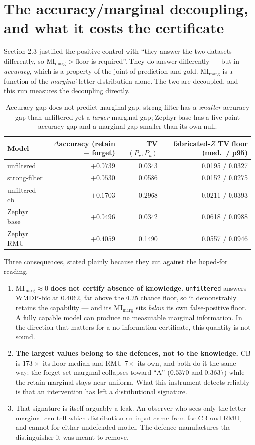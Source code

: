 \documentclass[11pt]{article}
\begin{document}
\section{The accuracy/marginal decoupling, and what it costs the certificate}
Section 2.3 justified the positive control with ``they answer the two datasets
differently, so $\mathrm{MI}_{\mathrm{marg}}>\text{floor}$ is required''. They do answer
differently --- but in \emph{accuracy}, which is a property of the joint of prediction and
gold. $\mathrm{MI}_{\mathrm{marg}}$ is a function of the \emph{marginal} letter distribution
alone. The two are decoupled, and this run measures the decoupling directly.
\begin{table}[h]\centering\small
\begin{tabular}{lrrr}
\toprule
Model & $\Delta$accuracy (retain $-$ forget) & TV$(P_r,P_u)$ & fabricated-$Z$ TV floor (med.\ / p95)\\
\midrule
unfiltered & $+0.0739$ & 0.0343 & 0.0195 / 0.0327\\
strong-filter & $+0.0530$ & 0.0586 & 0.0152 / 0.0275\\
unfiltered-cb & $+0.1703$ & 0.2968 & 0.0211 / 0.0393\\
Zephyr base & $+0.0496$ & 0.0342 & 0.0618 / 0.0988\\
Zephyr RMU & $+0.4059$ & 0.1490 & 0.0557 / 0.0946\\
\bottomrule\end{tabular}
\caption{Accuracy gap does not predict marginal gap. strong-filter has a
\emph{smaller} accuracy gap than unfiltered yet a \emph{larger} marginal gap; Zephyr base has
a five-point accuracy gap and a marginal gap smaller than its own null.}\label{tab:decouple}
\end{table}
Three consequences, stated plainly because they cut against the hoped-for reading.
\begin{enumerate}
\item \textbf{$\mathrm{MI}_{\mathrm{marg}}\approx0$ does not certify absence of
knowledge.} \texttt{unfiltered} answers WMDP-bio at $0.4062$, far above the $0.25$ chance
floor, so it demonstrably retains the capability --- and its
$\mathrm{MI}_{\mathrm{marg}}$ sits \emph{below} its own false-positive floor. A fully capable
model can produce no measurable marginal information. In the direction that matters for a
no-information certificate, this quantity is not sound.
\item \textbf{The largest values belong to the defences, not to the knowledge.} CB
is $173\times$ its floor median and RMU $7\times$ its own, and both do it the same way: the
forget-set marginal collapses toward ``A'' ($0.5370$ and $0.3637$) while the retain marginal
stays near uniform. What this instrument detects reliably is that an intervention has left a
distributional signature.
\item That signature is itself arguably a leak. An observer who sees only the
letter marginal can tell which distribution an input came from for CB and RMU, and cannot for
either undefended model. The defence manufactures the distinguisher it was meant to remove.
\end{enumerate}
\end{document}
